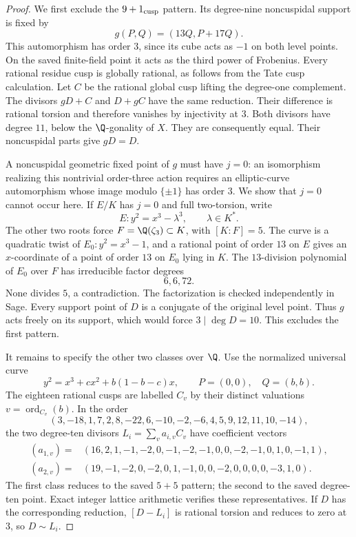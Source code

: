 \begin{proof}
We first exclude the $9+1_{\rm cusp}$ pattern. Its degree-nine
noncuspidal support is fixed by
\[
 g(P,Q)=(13Q,P+17Q).
\]
This automorphism has order $3$, since its cube acts as $-1$ on
both level points. On the saved finite-field point it acts as the
third power of Frobenius. Every rational residue cusp is globally
rational, as follows from the Tate cusp calculation.
Let $C$ be the rational global cusp lifting the degree-one
complement. The divisors $gD+C$ and $D+gC$ have the same reduction.
Their difference is rational torsion and therefore vanishes by
injectivity at $3$. Both divisors have degree $11$, below the
$\Q$-gonality of $X$. They are consequently equal. Their
noncuspidal parts give $gD=D$.

A noncuspidal geometric fixed point of $g$ must have $j=0$:
an isomorphism realizing this nontrivial order-three action requires
an elliptic-curve automorphism whose image modulo $\{\pm1\}$ has
order $3$. We show that $j=0$ cannot occur here. If $E/K$ has $j=0$
and full two-torsion, write
\[
 E:y^2=x^3-\lambda^3,
 \qquad \lambda\in K^*.
\]
The other two roots force $F=\Q(\zeta_3)\subset K$, with $[K:F]=5$.
The curve is a quadratic twist of $E_0:y^2=x^3-1$, and a rational
point of order $13$ on $E$ gives an $x$-coordinate of a point of
order $13$ on $E_0$ lying in $K$. The $13$-division polynomial of
$E_0$ over $F$ has irreducible factor degrees
\[
 6,6,72.
\]
None divides $5$, a contradiction. The factorization is checked
independently in Sage. Every support point of $D$ is a conjugate of the original level point.
Thus $g$ acts freely on its support,
which would force $3\mid\deg D=10$. This excludes the first pattern.

It remains to specify the other two classes over $\Q$. Use the
normalized universal curve
\[
 y^2=x^3+cx^2+b(1-b-c)x,\qquad P=(0,0),\quad Q=(b,b).
\]
The eighteen rational cusps are labelled $C_v$ by their distinct
valuations $v=\operatorname{ord}_{C_v}(b)$. In the order
\[
 (3,-18,1,7,2,8,-22,6,-10,-2,-6,4,5,9,12,11,10,-14),
\]
the two degree-ten divisors $L_i=\sum_v a_{i,v}C_v$ have coefficient
vectors
\[
\begin{aligned}
 (a_{1,v})={}&(16,2,1,-1,-2,0,-1,-2,-1,0,0,-2,-1,0,1,0,-1,1),\\
 (a_{2,v})={}&(19,-1,-2,0,-2,0,1,-1,0,0,-2,0,0,0,0,-3,1,0).
\end{aligned}
\]
The first class reduces to the saved $5+5$ pattern; the second to
the saved degree-ten point. Exact integer lattice arithmetic verifies
these representatives. If $D$ has the corresponding reduction,
$[D-L_i]$ is rational torsion and reduces to zero at $3$, so $D\sim L_i$.


\end{proof}
